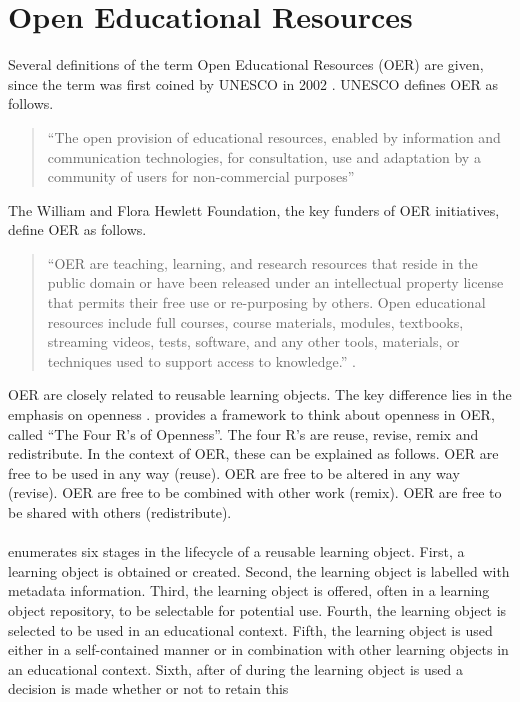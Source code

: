 \section{Open Educational Resources}
\label{sec:background_oer}
Several definitions of the term Open Educational Resources (OER) are given, since
the term was first coined by UNESCO in 2002 \citep{Camilleri2014}. UNESCO
defines	OER as follows.
\begin{quote}
``The open provision of educational resources, enabled by
information and communication technologies,
for consultation, use and adaptation by a community of users for non-commercial
purposes'' \citep{UNESCO2002}
\end{quote}
The William and Flora Hewlett Foundation, the key funders of OER initiatives,
define OER as follows.
\begin{quote}
``OER are teaching, learning, and research resources that reside in the public domain or have
been released under an intellectual property license that permits their free
use or re-purposing by others. Open educational resources include full courses,
course materials, modules, textbooks, streaming videos, tests, software, and
any other tools, materials, or techniques used to support access to
knowledge.'' \citep{Atkins2007}.
\end{quote}
OER are closely related to reusable learning objects. The key difference lies
in the emphasis on openness \citep{Camilleri2014}. \citet{Hilton2010} provides a framework to think
about openness in OER, called ``The Four R's of Openness''. The four R's are
reuse, revise, remix and redistribute. In the context of OER, these can be
explained as follows. OER are free to be used in any way (reuse). OER are free
to be altered in any way (revise). OER are free to be combined with other work
(remix). OER are free to be shared with others (redistribute).\\\\
\noindent
\citet{Collis2004} enumerates six stages in the lifecycle of a reusable learning object.
First, a learning object is obtained or created. Second, the learning object is labelled
with metadata information. Third, the learning object is offered, often in a
learning object repository, to be selectable for potential use. Fourth, the
learning object is selected to be used in an educational context. Fifth, the
learning object is used either in a self-contained manner or in combination
with other learning objects in an educational context. Sixth, after of during
the learning object is used a decision is made whether or not to retain this
